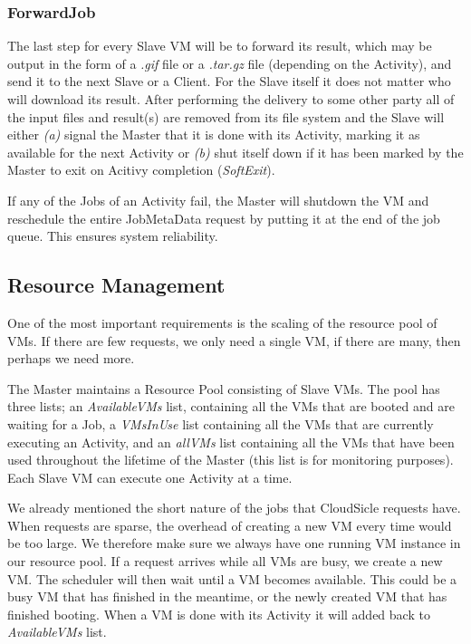 \documentclass[twocolumn,twoside]{IEEEtran}
\begin{document}
\subsubsection{ForwardJob}
The last step for every Slave VM will be to forward its result, which may be output in the form of a \textit{.gif} file or a \textit{.tar.gz} file (depending on the Activity), and send it to the next Slave or a Client.
For the Slave itself it does not matter who will download its result. After performing the delivery to some other party all of the input files and result(s) are removed from its file system and the Slave will either \emph{(a)} signal the Master that it is done with its Activity, marking it as available for the next Activity or \emph{(b)} shut itself down if it has been marked
by the Master to exit on Acitivy completion (\emph{SoftExit}).

If any of the Jobs of an Activity fail, the Master will shutdown the VM and reschedule the entire JobMetaData request by putting it at the end of the job queue.
This ensures system reliability.

\subsection{Resource Management}
One of the most important requirements is the scaling of the resource pool of VMs. If there are few requests, we only need a single VM, if there are many, then perhaps we need more.

The Master maintains a Resource Pool consisting of Slave VMs. The pool has three lists; an \emph{AvailableVMs} list, containing all the VMs that are booted and are waiting for a Job, a \emph{VMsInUse} list containing all the VMs that are currently executing an Activity, and an \emph{allVMs} list containing all the VMs that have been used throughout the lifetime of the Master (this list is for monitoring purposes). Each Slave VM can execute one Activity at a time.

We already mentioned the short nature of the jobs that CloudSicle requests have. When requests are sparse, the overhead of creating a new VM every time would be too large. We therefore make sure we always have one running VM instance in our resource pool. If a request arrives while all VMs are busy, we create a new VM. The scheduler will then wait until a VM becomes available. This could be a busy VM that has finished in the meantime, or the newly created VM that has finished booting. When a VM is done with its Activity it will added back to \emph{AvailableVMs} list. 
\end{document}
